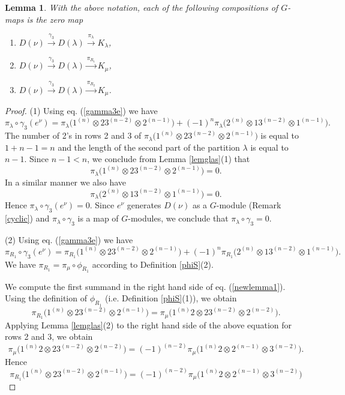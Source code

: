 \documentclass[11pt]{amsart}
\newtheorem{lem}[thm]{Lemma}
\theoremstyle{definition}
\numberwithin{equation}{section}
\begin{document}
\begin{lem}\label{gamma3}With the above notation, each of the following compositions of $G$-maps is the zero map
\begin{enumerate}
	\item $D(\nu) \xrightarrow{\gamma_3} D(\lambda) \xrightarrow{\pi_\lambda} K_\lambda$,
	\item $D(\nu) \xrightarrow{\gamma_3} D(\lambda) \xrightarrow{\pi_{R_1}} K_\mu$,
	\item $D(\nu) \xrightarrow{\gamma_3} D(\lambda) \xrightarrow{\pi_{R_2}} K_\mu$.
\end{enumerate}
\end{lem}
\begin{proof}
(1) Using eq. (\ref{gamma3e}) we have \[\pi_\lambda \circ \gamma_3 (e^\nu)=\pi_\lambda\big(1^{(n)} \otimes 23^{(n-2)} \otimes 2^{(n-1)}\big) +(-1)^n \pi_\lambda\big(2^{(n)} \otimes 13^{(n-2)}\otimes 1^{(n-1)}\big).\]
The number of 2's in rows 2 and 3 of $\pi_\lambda\big(1^{(n)} \otimes 23^{(n-2)} \otimes 2^{(n-1)}\big)$ is equal to $1+n-1=n$ and the length of the second part of the partition $\lambda$ is equal to $n-1$. Since $n-1 < n$, we conclude from Lemma \ref{lemglas}(1) that \[\pi_\lambda\big(1^{(n)} \otimes 23^{(n-2)} \otimes 2^{(n-1)}\big)=0.\] In a similar manner we also have  \[\pi_\lambda\big(2^{(n)} \otimes 13^{(n-2)}\otimes 1^{(n-1)}\big)=0.\] Hence $\pi_\lambda \circ \gamma_3 (e^\nu)=0.$ Since $e^{\nu}$ generates $D(\nu)$ as a $G$-module (Remark \ref{cyclic}) and $\pi_\lambda \circ \gamma_3$ is a map of $G$-modules, we conclude that $\pi_\lambda \circ \gamma_3=0.$

(2) Using eq. (\ref{gamma3e}) we have \begin{equation}\label{newlemma1}\pi_{R_1} \circ \gamma_3 (e^\nu)=\pi_{R_1}\big(1^{(n)} \otimes 23^{(n-2)} \otimes 2^{(n-1)}\big) +(-1)^n \pi_{R_1}\big(2^{(n)} \otimes 13^{(n-2)}\otimes1^{(n-1)}\big).\end{equation} We have $\pi_{R_1} = \pi_\mu \circ \phi_{R_1}$ according to Definition \ref{phiS}(2). 

We compute the first summand in the right hand side of eq. (\ref{newlemma1}). Using the definition of $\phi_{R_1} $ (i.e. Definition \ref{phiS}(1)),  we obtain 
\[
\pi_{R_1} \big(1^{(n)} \otimes 23^{(n-2)} \otimes 2^{(n-1)}\big)=\pi_{\mu} \big(1^{(n)}2 \otimes 23^{(n-2)} \otimes 2^{(n-2)}\big).
\]
Applying Lemma \ref{lemglas}(2) to the right hand side of the above equation for rows 2 and 3, we obtain \[ \pi_{\mu} \big(1^{(n)}2 \otimes 23^{(n-2)} \otimes 2^{(n-2)}\big)=  (-1)^{(n-2)}\pi_{\mu} \big(1^{(n)}2 \otimes 2^{(n-1)} \otimes 3^{(n-2)}\big).\] Hence 
\begin{equation}\label{newlemma2}
	\pi_{R_1} \big(1^{(n)} \otimes 23^{(n-2)} \otimes 2^{(n-1)}\big)=(-1)^{(n-2)}\pi_{\mu} \big(1^{(n)}2 \otimes 2^{(n-1)} \otimes 3^{(n-2)}\big)
\end{equation}


\end{proof}
\end{document}
